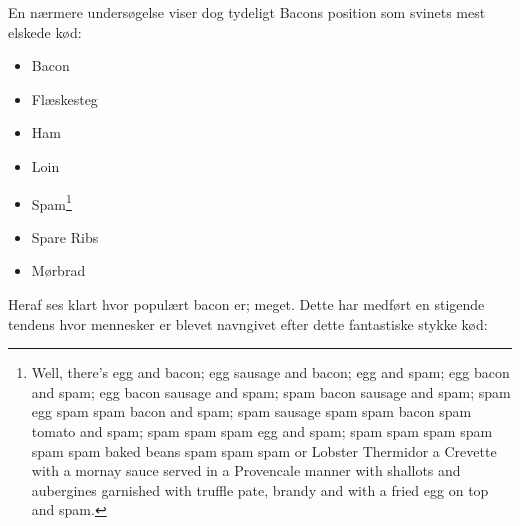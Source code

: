 En nærmere undersøgelse viser dog tydeligt Bacons position som svinets mest elskede kød:
\begin{itemize}
\item Bacon \cite{bib:url:WikiBacon}
\item Flæskesteg \cite{bib:url:WikiRoastPork}
\item Ham \cite{bib:url:WikiHam}
\item Loin \cite{bib:url:WikiLoin}
\item Spam\footnote{Well, there's egg and bacon; egg sausage and bacon; egg and spam; egg bacon and spam; egg bacon sausage and spam; spam bacon sausage and spam; spam egg spam spam bacon and spam; spam sausage spam spam bacon spam tomato and spam; spam spam spam egg and spam; spam spam spam spam spam spam baked beans spam spam spam or Lobster Thermidor a Crevette with a mornay sauce served in a Provencale manner with shallots and aubergines garnished with truffle pate, brandy and with a fried egg on top and spam.} \cite{bib:url:WikiSpam}
\item Spare Ribs \cite{bib:url:WikiSpareRibs}
\item Mørbrad \cite{bib:url:WikiTenderLoin}
\end{itemize}


Heraf ses klart hvor populært bacon er; meget. Dette har medført en stigende tendens hvor mennesker er blevet navngivet efter dette fantastiske stykke kød:

